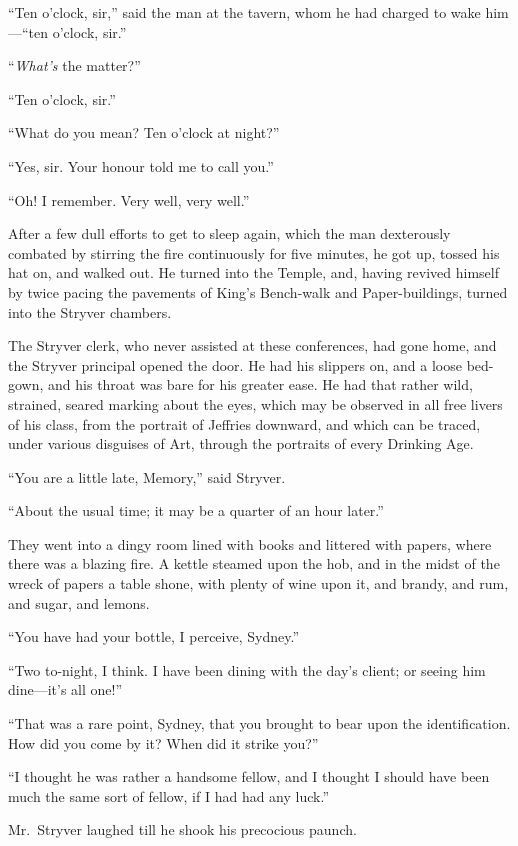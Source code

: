 ``Ten o'clock, sir,'' said the man at the tavern, whom he had charged to
wake him---``ten o'clock, sir.''

``\emph{What's} the matter?''

``Ten o'clock, sir.''

``What do you mean?  Ten o'clock at night?''

``Yes, sir.  Your honour told me to call you.''

``Oh!  I remember.  Very well, very well.''

After a few dull efforts to get to sleep again, which the man dexterously
combated by stirring the fire continuously for five minutes, he got up,
tossed his hat on, and walked out.  He turned into the Temple, and,
having revived himself by twice pacing the pavements of King's Bench-walk
and Paper-buildings, turned into the Stryver chambers.

The Stryver clerk, who never assisted at these conferences, had gone home,
and the Stryver principal opened the door.  He had his slippers on,
and a loose bed-gown, and his throat was bare for his greater ease.
He had that rather wild, strained, seared marking about the eyes,
which may be observed in all free livers of his class, from the portrait
of Jeffries downward, and which can be traced, under various disguises
of Art, through the portraits of every Drinking Age.

``You are a little late, Memory,'' said Stryver.

``About the usual time; it may be a quarter of an hour later.''

They went into a dingy room lined with books and littered with papers,
where there was a blazing fire.  A kettle steamed upon the hob, and in
the midst of the wreck of papers a table shone, with plenty of wine
upon it, and brandy, and rum, and sugar, and lemons.

``You have had your bottle, I perceive, Sydney.''

``Two to-night, I think.  I have been dining with the day's client;
or seeing him dine---it's all one!''

``That was a rare point, Sydney, that you brought to bear upon the
identification.  How did you come by it?  When did it strike you?''

``I thought he was rather a handsome fellow, and I thought I should
have been much the same sort of fellow, if I had had any luck.''

Mr.\ Stryver laughed till he shook his precocious paunch.

